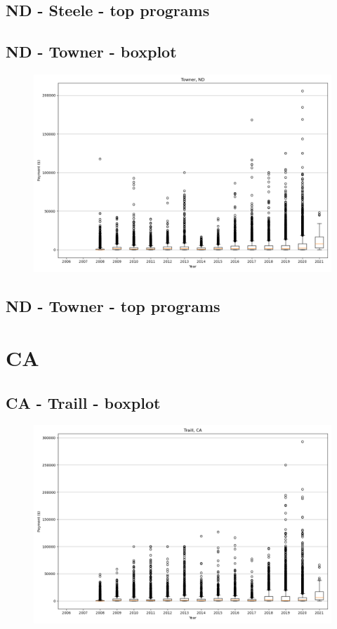 \subsection*{ND - Steele - top programs}

\newpage
\subsection*{ND - Towner - boxplot}
\begin{figure}[h]
\centering
\includegraphics[width=7in]{../output/boxplots/counties/Towner-ND_boxplot.png}
\end{figure}


\subsection*{ND - Towner - top programs}

\newpage
\section*{CA}
\subsection*{CA - Traill - boxplot}
\begin{figure}[h]
\centering
\includegraphics[width=7in]{../output/boxplots/counties/Traill-CA_boxplot.png}
\end{figure}


